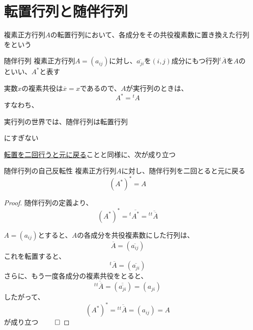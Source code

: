 \documentclass[../../../topic_linear-algebra]{subfiles}
\begin{document}
\sectionline
\section{転置行列と随伴行列}

複素正方行列$A$の転置行列において、各成分をその共役複素数に置き換えた行列をという

\begin{definition}{随伴行列}
  複素正方行列$A = (a_{ij})$に対し、$\overline{a_{ji}}$を$(i,j)$成分にもつ行列${}^t\overline{A}$を$A$のといい、$A^*$と表す
\end{definition}

実数$x$の複素共役は$\overline{x} = x$であるので、$A$が実行列のときは、
\begin{equation*}
  A^* = {}^t A
\end{equation*}
すなわち、
\begin{shaded}
  実行列の世界では、随伴行列は転置行列
\end{shaded}
にすぎない

\sectionline

\hyperref[thm:transpose-involution]{転置を二回行うと元に戻る}ことと同様に、次が成り立つ

\begin{theorem}{随伴行列の自己反転性}
  複素正方行列$A$に対し、随伴行列を二回とると元に戻る
  \begin{equation*}
    (A^*)^* = A
  \end{equation*}
\end{theorem}

\begin{proof}
  随伴行列の定義より、
  \begin{equation*}
    (A^*)^* = {}^t\overline{A^*} = {}^t\overline{{}^t\overline{A}}
  \end{equation*}

  $A = (a_{ij})$とすると、$A$の各成分を共役複素数にした行列は、
  \begin{equation*}
    \overline{A} = (\overline{a_{ij}})
  \end{equation*}
  これを転置すると、
  \begin{equation*}
    {}^t\overline{A} = (\overline{a_{ji}})
  \end{equation*}
  さらに、もう一度各成分の複素共役をとると、
  \begin{equation*}
    {}^t\overline{{}^t\overline{A}} = (\overline{\overline{a_{ji}}}) = (a_{ji})
  \end{equation*}
  したがって、
  \begin{equation*}
    (A^*)^* = {}^t\overline{{}^t\overline{A}} = (a_{ij}) = A
  \end{equation*}
  が成り立つ $\qed$
\end{proof}
\end{document}

